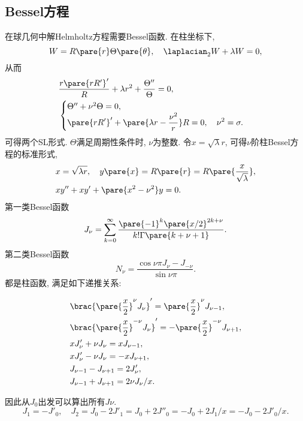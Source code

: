 \documentclass[hidelinks]{ctexart}
\begin{document}

\subsection{Bessel方程} %
\label{sub:bessel方程}

\newpoint{}在球几何中解Helmholtz方程需要Bessel函数.
\newpoint{}在柱坐标下,
\[ W = R\pare{r}\Theta\pare{\theta},\quad \laplacian_2 W + \lambda W = 0, \]
从而
\begin{align*}
    & \frac{r\pare{rR'}'}{R} + \lambda r^2 + \frac{\Theta''}{\Theta} = 0, \\
    & \begin{cases}
        \Theta'' + \nu^2 \Theta = 0, \\
        \displaystyle \pare{rR'}' + \pare{\lambda r - \frac{\nu^2}{r}}R = 0,\quad \nu^2 = \sigma.
    \end{cases}
\end{align*}
\newpoint{}可得两个SL形式. $\Theta$满足周期性条件时, $\nu$为整数.
\newpoint{}令$x=\sqrt{\lambda}r$, 可得$\nu$阶柱Bessel方程的标准形式,
\begin{align*}
    & x = \sqrt{\lambda r},\quad y\pare{x} = R\pare{r} = R\pare{\frac{x}{\sqrt{\lambda}}}, \\
    & xy'' + xy' + \pare{x^2 - \nu^2} y = 0.
\end{align*}
\newpoint{}第一类Bessel函数
\[ J_\nu = \sum_{k=0}^\infty \frac{\pare{-1}^k\pare{x/2}^{2k+\nu}}{k!\Gamma\pare{k+\nu + 1}}. \]
\newpoint{}第二类Bessel函数
\[ N_\nu = \frac{\cos \nu\pi J_\nu - J_{-\nu}}{\sin \nu\pi}. \]
都是柱函数, 满足如下递推关系:
\begin{resume}
    \vspace{-\baselineskip}
    \begin{align*}
        & \brac{\pare{\frac{x}{2}}^\nu J_\nu}' = \pare{\frac{x}{2}}^{\nu} J_{\nu - 1}, \\
        & \brac{\pare{\frac{x}{2}}^{-\nu} J_\nu}' = -\pare{\frac{x}{2}}^{-\nu} J_{\nu + 1}, \\
        & xJ'_\nu + \nu J_\nu = xJ_{\nu - 1}, \\
        & xJ'_\nu - \nu J_\nu = -xJ_{\nu + 1}, \\
        & J_{\nu - 1} - J_{\nu + 1} = 2J'_\nu, \\
        & J_{\nu - 1} + J_{\nu + 1} = 2\nu J_\nu/x.
    \end{align*}
\end{resume}
因此从$J_0$出发可以算出所有$J\nu$.
\[ J_1 = -J'_0,\quad J_2 = J_0 - 2J'_1 = J_0 + 2J''_0 = -J_0 + 2J_1/x = -J_0 - 2J'_0/x. \]
\end{document}

